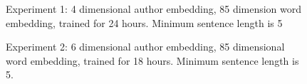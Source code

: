 \documentclass{article}%
\begin{document}
\begin{figure}
\noindent{}
\caption{Experiment 1: 4 dimensional author embedding, 85 dimension word embedding, trained for 24 hours. Minimum sentence length is 5}
\end{figure}


\begin{figure}
\noindent{}
\caption{Experiment 2: 6 dimensional author embedding, 85 dimensional word embedding, trained for 18 hours. Minimum sentence length is 5.}
\end{figure}
\end{document}
